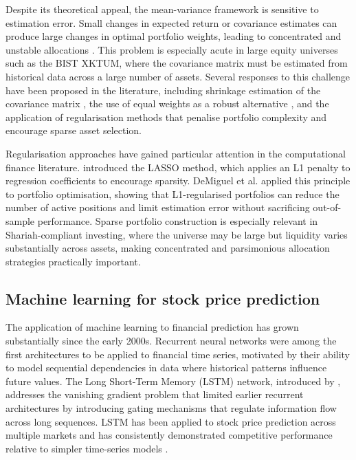 Despite its theoretical appeal, the mean-variance framework is sensitive to
estimation error. Small changes in expected return or covariance estimates can
produce large changes in optimal portfolio weights, leading to concentrated and
unstable allocations \citep{michaud1989markowitz}. This problem is especially
acute in large equity universes such as the BIST XKTUM, where the covariance
matrix must be estimated from historical data across a large number of assets.
Several responses to this challenge have been proposed in the literature,
including shrinkage estimation of the covariance matrix
\citep{ledoit2004honey}, the use of equal weights as a robust alternative
\citep{taljaard2020equal, sen2023equal}, and the application of regularisation
methods that penalise portfolio complexity and encourage sparse asset selection.

Regularisation approaches have gained particular attention in the computational
finance literature. \citet{tibshirani1996regression} introduced the LASSO
method, which applies an L1 penalty to regression coefficients to encourage
sparsity. DeMiguel et al. applied this principle to portfolio optimisation, showing
that L1-regularised portfolios can reduce the number of active positions and
limit estimation error without sacrificing out-of-sample performance. Sparse
portfolio construction is especially relevant in Shariah-compliant investing,
where the universe may be large but liquidity varies substantially across assets,
making concentrated and parsimonious allocation strategies practically important.

\subsection{Machine learning for stock price prediction}

The application of machine learning to financial prediction has grown substantially
since the early 2000s. Recurrent neural networks were among the first architectures
to be applied to financial time series, motivated by their ability to model
sequential dependencies in data where historical patterns influence future values.
The Long Short-Term Memory (LSTM) network, introduced by
\citet{hochreiter1997long}, addresses the vanishing gradient problem that limited
earlier recurrent architectures by introducing gating mechanisms that regulate
information flow across long sequences. LSTM has been applied to stock price
prediction across multiple markets and has consistently demonstrated competitive
performance relative to simpler time-series models
\citep{zhang2023stock, lu2023lstm}.

